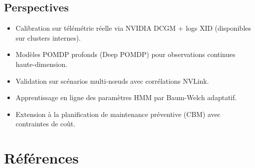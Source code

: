 \documentclass[12pt,a4paper]{article}
\begin{document}
\subsection{Perspectives}

\begin{itemize}
  \item Calibration sur télémétrie réelle via NVIDIA DCGM + logs XID (disponibles sur clusters internes).
  \item Modèles POMDP profonds (Deep POMDP) pour observations continues haute-dimension.
  \item Validation sur scénarios multi-nœuds avec corrélations NVLink.
  \item Apprentissage en ligne des paramètres HMM par Baum-Welch adaptatif.
  \item Extension à la planification de maintenance préventive (CBM) avec contraintes de coût.
\end{itemize}

\FloatBarrier
\clearpage

\section{Références}
\end{document}
